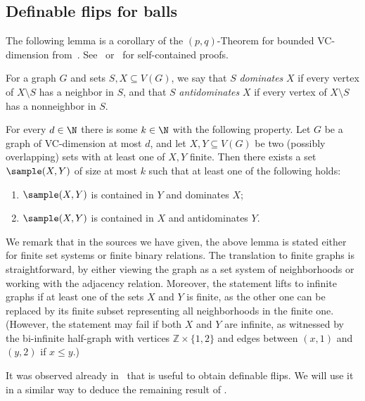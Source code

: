 \subsection{Definable flips for balls}\label{sec:definable-flips-for-balls}

The following lemma is a corollary of the $(p,q)$-Theorem for bounded VC-dimension from~\cite{Matousek:p-q-theorem}.
See~\cite[Corollary~6.13]{simon_book} or~\cite[full version, Theorem~E.2]{flip-width} for self-contained proofs.

For a graph $G$ and sets $S,X\subseteq V(G)$, we say that $S$ \emph{dominates} $X$ if every vertex of $X \setminus S$ has a neighbor in $S$, and that $S$ \emph{antidominates} $X$ if every vertex of $X \setminus S$ has a nonneighbor in $S$.

\begin{lemma}\label{lem:vc-duality}
    For every $d\in\N$ there is some $k\in\N$ with the following property.
    Let $G$ be a graph of VC-dimension at most $d$, and let $X,Y\subseteq V(G)$ be two (possibly overlapping) sets with at least one of $X,Y$ finite.
    Then there exists a set $\sample(X,Y)$ of size at most $k$ such that at least one of the following holds:
    \begin{enumerate}
        \item $\sample(X,Y)$ is contained in $Y$ and dominates $X$;
        \item $\sample(X,Y)$ is  contained in $X$ and antidominates $Y$.
    \end{enumerate}
\end{lemma}
We remark that in the sources we have given, the above lemma is stated either for finite set systems or finite binary relations.
The translation to finite graphs is straightforward, by either viewing the graph as a set system of neighborhoods or working with the adjacency relation.
Moreover, the statement lifts to infinite graphs if at least one of the sets $X$ and $Y$ is finite, as the other one can be replaced by its finite subset representing all neighborhoods in the  finite one.
(However, the statement may fail if both $X$ and $Y$ are infinite, as witnessed by the bi-infinite half-graph with vertices $\mathbb{Z} \times \{1,2\}$ and edges between $(x,1)$ and $(y,2)$ if $x\leq y$.)

It was observed already in~\cite{DBLP:conf/lics/BonnetDGKMST22} that  is useful to obtain definable flips.
We will use it in a similar way to deduce the remaining result of .

